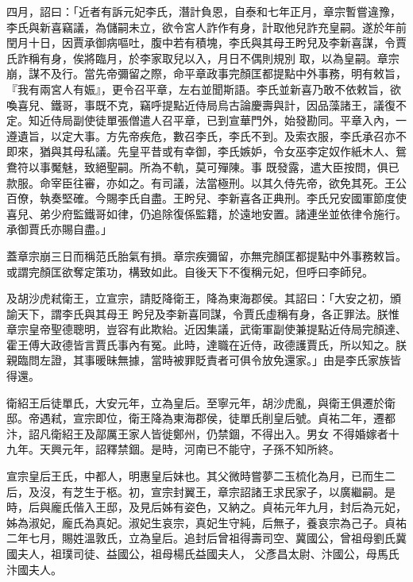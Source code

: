 \begin{pinyinscope}
 四月，詔曰：「近者有訴元妃李氏，潛計負恩，自泰和七年正月，章宗暫嘗違豫，李氏與新喜竊議，為儲嗣未立，欲令宮人詐作有身，計取他兒詐充皇嗣。遂於年前閏月十日，因賈承御病嘔吐，腹中若有積塊，李氏與其母王盻兒及李新喜謀，令賈氏詐稱有身，俟將臨月，於李家取兒以入，月日不偶則規別
 取，以為皇嗣。章宗崩，謀不及行。當先帝彌留之際，命平章政事完顏匡都提點中外事務，明有敕旨，『我有兩宮人有娠』，更令召平章，左右並聞斯語。李氏並新喜乃敢不依敕旨，欲喚喜兒、鐵哥，事既不克，竊呼提點近侍局烏古論慶壽與計，因品藻諸王，議復不定。知近侍局副使徒單張僧遣人召平章，已到宣華門外，始發勘同。平章入內，一遵遺旨，以定大事。方先帝疾危，數召李氏，李氏不到。及索衣服，李氏承召亦不即來，猶與其母私議。先皇平昔或有幸御，李氏嫉妒，令女巫李定奴作紙木人、鴛鴦符以事魘魅，致絕聖嗣。所為不軌，莫可殫陳。事
 既發露，遣大臣按問，俱已款服。命宰臣往審，亦如之。有司議，法當極刑。以其久侍先帝，欲免其死。王公百僚，執奏堅確。今賜李氏自盡。王盻兒、李新喜各正典刑。李氏兄安國軍節度使喜兒、弟少府監鐵哥如律，仍追除復係監籍，於遠地安置。諸連坐並依律令施行。承御賈氏亦賜自盡。」



 蓋章宗崩三日而稱范氏胎氣有損。章宗疾彌留，亦無完顏匡都提點中外事務敕旨。或謂完顏匡欲奪定策功，構致如此。自後天下不復稱元妃，但呼曰李師兒。



 及胡沙虎弒衛王，立宣宗，請貶降衛王，降為東海郡侯。其詔曰：「大安之初，頒諭天下，謂李氏與其母王
 盻兒及李新喜同謀，令賈氏虛稱有身，各正罪法。朕惟章宗皇帝聖德聰明，豈容有此欺紿。近因集議，武衛軍副使兼提點近侍局完顏達、霍王傅大政德皆言賈氏事內有冤。此時，達職在近侍，政德護賈氏，所以知之。朕親臨問左證，其事暖昧無據，當時被罪貶責者可俱令放免還家。」由是李氏家族皆得還。



 衛紹王后徒單氏，大安元年，立為皇后。至寧元年，胡沙虎亂，與衛王俱遷於衛邸。帝遇弒，宣宗即位，衛王降為東海郡侯，徒單氏削皇后號。貞祐二年，遷都汴，詔凡衛紹王及鄗厲王家人皆徙鄭州，仍禁錮，不得出入。男女
 不得婚嫁者十九年。天興元年，詔釋禁錮。是時，河南已不能守，子孫不知所終。



 宣宗皇后王氏，中都人，明惠皇后妹也。其父微時嘗夢二玉梳化為月，已而生二后，及沒，有芝生于柩。初，宣宗封翼王，章宗詔諸王求民家子，以廣繼嗣。是時，后與龐氏偕入王邸，及見后姊有姿色，又納之。貞祐元年九月，封后為元妃，姊為淑妃，龐氏為真妃。淑妃生哀宗，真妃生守純，后無子，養哀宗為己子。貞祐二年七月，賜姓溫敦氏，立為皇后。追封后曾祖得壽司空、冀國公，曾祖母劉氏冀國夫人，祖璞司徒、益國公，祖母楊氏益國夫人，
 父彥昌太尉、汴國公，母馬氏汴國夫人。




\end{pinyinscope}
